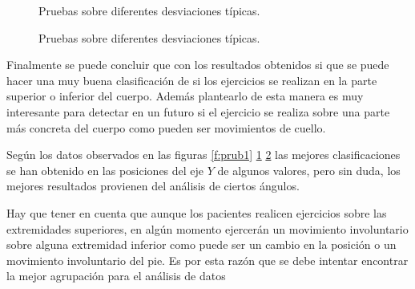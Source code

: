 \begin{figure}
 \centering
    \vspace{1mm}
      \vspace{1mm}
      \vspace{1mm}
 \caption{Pruebas sobre diferentes desviaciones típicas.}
 \label{f:prub2}
\end{figure}

\begin{figure}
 \centering
{}\vspace{1mm}
      \vspace{1mm}
 \caption{Pruebas sobre diferentes desviaciones típicas.}
 \label{f:prub3}
\end{figure}


Finalmente se puede concluir que con los resultados obtenidos si que se puede hacer una muy buena clasificación de si los ejercicios se realizan en la parte superior o inferior del cuerpo. Además plantearlo de esta manera es muy interesante para detectar en un futuro si el ejercicio se realiza sobre una parte más concreta del cuerpo como pueden ser movimientos de cuello.

Según los datos observados en las figuras \ref{f:prub1} \ref{f:prub2} \ref{f:prub3} las mejores clasificaciones se han obtenido en las posiciones del eje $Y$ de algunos valores, pero sin duda, los mejores resultados provienen del análisis de ciertos ángulos. 

Hay que tener en cuenta que aunque los pacientes realicen ejercicios sobre las extremidades superiores, en algún momento ejercerán un movimiento involuntario sobre alguna extremidad inferior como puede ser un cambio en la posición o un movimiento involuntario del pie. Es por esta razón que se debe intentar encontrar la mejor agrupación para el análisis de datos

